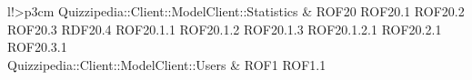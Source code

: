 \begin{tabella}{l!{\VRule}>{\centering\arraybackslash}p{3cm}}
Quizzipedia::Client::ModelClient::Statistics & ROF20 \linebreak ROF20.1 \linebreak ROF20.2 \linebreak ROF20.3 \linebreak RDF20.4 \linebreak ROF20.1.1 \linebreak ROF20.1.2 \linebreak ROF20.1.3 \linebreak ROF20.1.2.1 \linebreak ROF20.2.1 \linebreak ROF20.3.1 \\
Quizzipedia::Client::ModelClient::Users & ROF1 \linebreak ROF1.1 \linebrea
\end{tabella}
